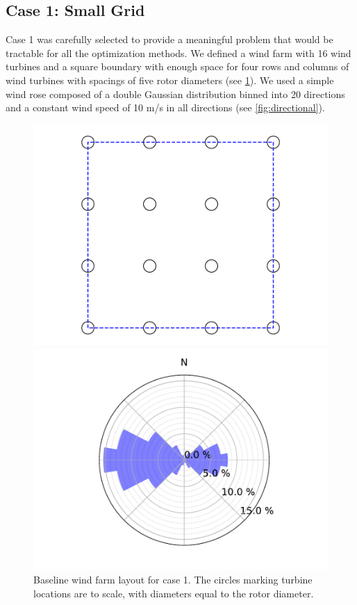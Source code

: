 \documentclass[a4paper]{jpconf}
\begin{document}
\subsection{Case 1: Small Grid}
Case 1 was carefully selected to provide a meaningful problem that would be tractable for all the optimization methods. We defined a wind farm with 16 wind turbines and a square boundary with enough space for four rows and columns of wind turbines with spacings of five rotor diameters (see \cref{fig:grid_case}). We used a simple wind rose composed of a double Gaussian distribution binned into 20 directions and a constant wind speed of 10 m/s in all directions (see \cref{fig:directional}).
\begin{figure}[h!]
\centering
\begin{minipage}[t]{18pc}
\centering
\includegraphics[width=1.\textwidth, trim={1.5cm, 0cm, 1.5cm, 0cm}, clip]{final_images/layouts/16_turb_start.pdf}
\caption{Baseline wind farm layout for case 1. The circles marking turbine locations are to scale, with diameters equal to the rotor diameter.}
\label{fig:grid_case}
\end{minipage}\hspace{1pc}%
\begin{minipage}[t]{18pc}
\centering
\includegraphics[width=\textwidth, trim={2.0cm 0cm 2.0cm 0cm}, clip]{final_images/windroses/freqwindrose_20_dir.pdf}

\end{minipage}
\end{figure}
\end{document}
